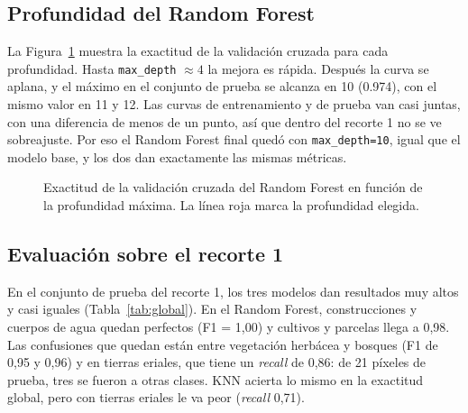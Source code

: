 \documentclass[11pt,letterpaper]{article}
\begin{document}
\subsection{Profundidad del Random Forest}
La Figura~\ref{fig:profundidad} muestra la exactitud de la validación cruzada para cada profundidad. Hasta
\texttt{max\_depth} $\approx 4$ la mejora es rápida. Después la curva se aplana, y el máximo en el
conjunto de prueba se alcanza en 10 (\num{0.974}), con el mismo valor en 11 y 12. Las curvas de
entrenamiento y de prueba van casi juntas, con una diferencia de menos de un punto, así que dentro del
recorte 1 no se ve sobreajuste. Por eso el Random Forest final quedó con \texttt{max\_depth=10}, igual que
el modelo base, y los dos dan exactamente las mismas métricas.

\begin{figure}[H]
\centering
{}
\caption{Exactitud de la validación cruzada del Random Forest en función de la profundidad máxima. La línea roja marca la profundidad elegida.}
\label{fig:profundidad}
\end{figure}

\subsection{Evaluación sobre el recorte 1}
En el conjunto de prueba del recorte 1, los tres modelos dan resultados muy altos y casi iguales
(Tabla~\ref{tab:global}). En el Random Forest, construcciones y cuerpos de agua quedan perfectos
(F1 = 1,00) y cultivos y parcelas llega a 0,98. Las confusiones que quedan están entre vegetación herbácea
y bosques (F1 de 0,95 y 0,96) y en tierras eriales, que tiene un \emph{recall} de 0,86: de 21 píxeles de
prueba, tres se fueron a otras clases. KNN acierta lo mismo en la exactitud global, pero con tierras
eriales le va peor (\emph{recall} 0,71).
\end{document}
